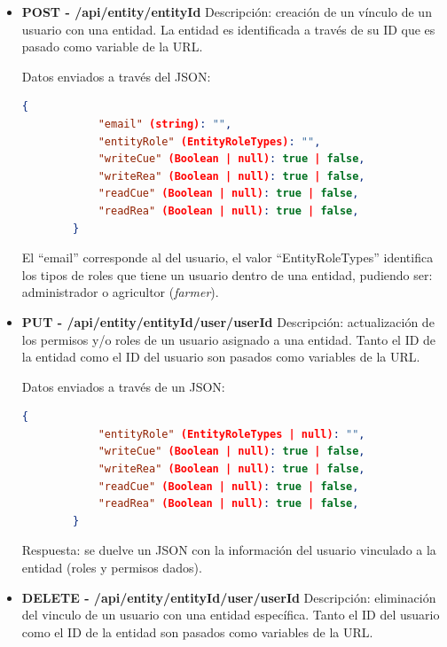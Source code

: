\begin{itemize}
\begin{itemize}
        Respuesta: devuelve un JSON con la información del entidad creada.

        \item \textbf{POST - /api/entity/{entityId}} \newline
        Descripción: creación de un vínculo de un usuario con una entidad. La entidad es identificada a través de su ID que es pasado
        como variable de la URL. 
        
        Datos enviados a través del JSON:
        \begin{lstlisting}[language=json,caption={Creación de usuario vinculado a entidad}]
        {
            "email" (string): "",
            "entityRole" (EntityRoleTypes): "",
            "writeCue" (Boolean | null): true | false,
            "writeRea" (Boolean | null): true | false,
            "readCue" (Boolean | null): true | false,
            "readRea" (Boolean | null): true | false,
        }
        \end{lstlisting}

        El ``email'' corresponde al del usuario, el valor ``EntityRoleTypes'' identifica los tipos de roles que tiene un usuario dentro 
        de una entidad, pudiendo ser: administrador o agricultor (\textit{farmer}).

        \item \textbf{PUT - /api/entity/{entityId}/user/{userId}} \newline
        Descripción: actualización de los permisos y/o roles de un usuario asignado a una entidad. Tanto el ID de la entidad como el ID
        del usuario son pasados como variables de la URL. 
        
        Datos enviados a través de un JSON:
        \begin{lstlisting}[language=json,caption={Actualización de datos de un usuario vinculado a una entidad}]
        {
            "entityRole" (EntityRoleTypes | null): "",
            "writeCue" (Boolean | null): true | false,
            "writeRea" (Boolean | null): true | false,
            "readCue" (Boolean | null): true | false,
            "readRea" (Boolean | null): true | false,
        }
        \end{lstlisting}

        Respuesta: se duelve un JSON con la información del usuario vinculado a la entidad (roles y permisos dados).

        \item \textbf{DELETE - /api/entity/{entityId}/user/{userId}} \newline
        Descripción: eliminación del vinculo de un usuario con una entidad específica. Tanto el ID del usuario como el ID de la entidad 
        son pasados como variables de la URL. 


\end{itemize}
\end{itemize}
